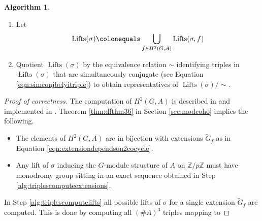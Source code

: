 \documentclass{dcthesis}
\newcommand{\ZZ}{\mathbb Z}
\newcommand{\wt}[1]{\widetilde{#1}}
\DeclareMathOperator{\Lifts}{Lifts}
\numberwithin{equation}{section}
\theoremstyle{definition}
\newtheorem{alg}[equation]{Algorithm}
\theoremstyle{remark}
\begin{document}
{{\begin{alg}
\begin{enumerate}
        \item
          \label{alg:triplesunionoflifts}
          Let
          \begin{equation}
            \label{eqn:unionoflifts}
            \Lifts(\sigma)
            \colonequals
            \bigcup_{f\in H^2(G,A)}
            \Lifts(\sigma, f)
          \end{equation}
        \item
          \label{alg:triplesuptoisomorphism}
          Quotient $\Lifts(\sigma)$
          by the equivalence relation
          $\sim$ identifying triples
          in $\Lifts(\sigma)$ that
          are simultaneously conjugate
          (see Equation
          \ref{eqn:simconjbelyitriple})
          to obtain representatives of
          $\Lifts(\sigma)/\!\!\sim$.
      \end{enumerate}
    \end{alg}
    \begin{proof}[Proof of correctness]
      The computation of $H^2(G,A)$ is described
      in \cite{magmabook} and implemented in
      \cite{magma}.
      Theorem \ref{thm:dfthm36}
      in Section \ref{sec:modcoho} implies
      the following.
      \begin{itemize}
        \item
          The elements of $H^2(G,A)$
          are in bijection
          with extensions
          $\wt{G}_f$
          as in Equation
          \ref{eqn:extensiondependson2cocycle}.
        \item
          Any lift of $\sigma$
          inducing the $G$-module
          structure of $A$ on $\ZZ/p\ZZ$
          must have monodromy group sitting
          in an exact sequence obtained in
          Step \ref{alg:triplescomputeextensions}.
      \end{itemize}
      In Step \ref{alg:triplescomputelifts}
      all possible lifts of $\sigma$
      for a single extension $\wt{G}_f$
      are computed.
      This is done by computing
      all $(\#A)^3$
      triples mapping to

\end{proof}}}
\end{document}
